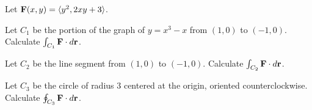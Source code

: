 \begin{activity} \label{A:12.3.2}  
\nin Let $\mathbf{F}(x,y) = \langle y^2,2xy+3\rangle$.
\ba
\item Let $C_1$ be the portion of the graph of $y=x^3-x$ from $(1,0)$
  to $(-1,0)$. Calculate $\int_{C_1}\mathbf{F}\cdot d\mathbf{r}$.
\item Let $C_2$ be the line segment from $(1,0)$ to
  $(-1,0)$. Calculate $\int_{C_2}\mathbf{F}\cdot d\mathbf{r}$.
\item Let $C_3$ be the circle of radius $3$ centered at the origin,
  oriented counterclockwise. Calculate $\oint_{C_3} \mathbf{F}\cdot d\mathbf{r}$.
\ea
\end{activity}
\begin{smallhint}

\end{smallhint}
\begin{bighint}

\end{bighint}
\begin{activitySolution}

\end{activitySolution}
\aftera
